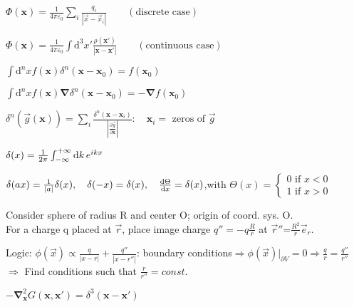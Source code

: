 \item $\Phi(\boldsymbol{x}) = \frac{1}{4\pi \varepsilon_0} \sum_{i} \frac{q_i}{|\vec{x}-\vec{x}_i|} \qquad (\text{discrete case})$

\item $\Phi(\boldsymbol{x}) = \frac{1}{4\pi \varepsilon_0} \int \text{d}^3x' \frac{\rho(\boldsymbol{x}')}{|\boldsymbol{x}-\boldsymbol{x}'|} \qquad (\text{continuous case})$
\squishend

\squishlist
\item $\int \text{d}^nx f(\boldsymbol{x})\delta^n(\boldsymbol{x}-\boldsymbol{x}_0)= f(\boldsymbol{x}_0)$

\item $\int \text{d}^nx f(\boldsymbol{x})\boldsymbol{\nabla}\delta^n(\boldsymbol{x}-\boldsymbol{x}_0)= - \boldsymbol{\nabla}f(\boldsymbol{x}_0)$

\item $\delta^n(\vec{g}(\boldsymbol{x})) = \sum_i \frac{\delta^n(\boldsymbol{x}-\boldsymbol{x}_i)}{\left|\frac{\partial \vec{g}}{\partial \boldsymbol{x}} \right|} : \quad \boldsymbol{x}_i = \text{ zeros of }\vec{g}$

\item $\delta(x) = \frac{1}{2\pi} \int_{-\infty}^{+\infty}\textrm{d} k \, e^{ikx}$

\item $\delta(ax) = \frac{1}{|a|} \delta(x), \quad \delta(-x) = \delta(x), \quad \frac{\textrm{d} \Theta}{\textrm{d} x} = \delta(x)$,\quad with $\Theta(x)=\begin{cases}0 \text{ if } x<0\\1 \text{ if } x>0\end{cases}$
\squishend
{}
\squishlist
\item Consider sphere of radius R and center O; origin of coord. sys. O.\\
For a charge q placed at $\vec{r}$, place image charge $q''=-q\frac{R}{r}$ at $\vec{r}''$=$\frac{R^2}{r}\vec{e}_r$.
\item Logic: 
$\phi(\vec{x})\propto\frac{q}{|x-r|}+\frac{q''}{|x-r''|}$: boundary conditions$\Rightarrow\phi(\vec{x})|_{\partial V}=0\Rightarrow\frac{q}{r}=\frac{q''}{r''}$\\
$\Rightarrow$ Find conditions such that $\frac{r}{r''}=const$.\\
\squishend
\vspace{5cm}
\squishlist
\item $-\boldsymbol{\nabla}_{\boldsymbol{x}}^2 G(\boldsymbol{x}, \boldsymbol{x}') = \delta^3(\boldsymbol{x}-\boldsymbol{x}')$

